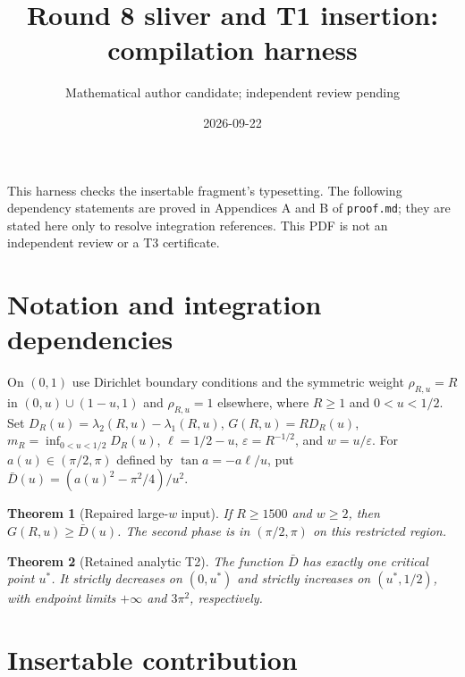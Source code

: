 \documentclass[11pt]{article}
\title{Round 8 sliver and T1 insertion: compilation harness}
\author{Mathematical author candidate; independent review pending}
\date{2026-09-22}
\newtheorem{theorem}{Theorem}[section]
\begin{document}
\maketitle
\noindent This harness checks the insertable fragment's typesetting.
The following dependency statements are proved in Appendices A and B of
\texttt{proof.md}; they are stated here only to resolve integration references.
This PDF is not an independent review or a T3 certificate.
\section{Notation and integration dependencies}
On $(0,1)$ use Dirichlet boundary conditions and the symmetric weight
$\rho_{R,u}=R$ in $(0,u)\cup(1-u,1)$ and $\rho_{R,u}=1$ elsewhere,
where $R\ge1$ and $0<u<1/2$. Set
$D_R(u)=\lambda_2(R,u)-\lambda_1(R,u)$,
$G(R,u)=R D_R(u)$, $m_R=\inf_{0<u<1/2}D_R(u)$,
$\ell=1/2-u$, $\varepsilon=R^{-1/2}$, and $w=u/\varepsilon$.
For $a(u)\in(\pi/2,\pi)$ defined by $\tan a=-a\ell/u$, put
$\bar D(u)=(a(u)^2-\pi^2/4)/u^2$.
\begin{theorem}[Repaired large-$w$ input]\label{thm:lemAdp}
If $R\ge1500$ and $w\ge2$, then $G(R,u)\ge\bar D(u)$.
The second phase is in $(\pi/2,\pi)$ on this restricted region.
\end{theorem}
\begin{theorem}[Retained analytic T2]\label{thm:T2}
The function $\bar D$ has exactly one critical point $u^*$.
It strictly decreases on $(0,u^*)$ and strictly increases on $(u^*,1/2)$,
with endpoint limits $+\infty$ and $3\pi^2$, respectively.
\end{theorem}
\section{Insertable contribution}

\end{document}
